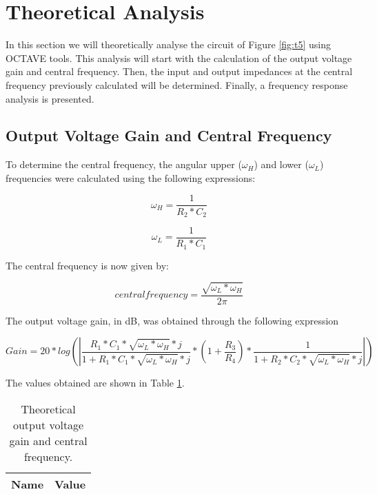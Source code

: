 \newpage
{}
\section{Theoretical Analysis}
\label{sec:analysis}

In this section we will theoretically analyse the circuit of Figure \ref{fig:t5} using OCTAVE tools. This analysis will start with the calculation of the output voltage gain and central frequency. Then, the input and output impedances at the central frequency previously calculated will be determined. Finally, a frequency response analysis is presented.


\subsection{Output Voltage Gain and Central Frequency}


To determine the central frequency, the angular upper ($\omega_H$) and lower ($\omega_L$) frequencies were calculated using the following expressions:

\begin {equation}
	\omega_H = \frac{1}{R_2 *C_2}  
	\label{eq:wh}
\end{equation}

\begin {equation}
	\omega_L= \frac{1}{R_1*C_1}   
	\label{eq:wl}
\end{equation}

The central frequency is now given by:

\begin {equation}
	central frequency = \frac{\sqrt{\omega_L * \omega_H }}{2\pi}
	\label{eq:CentralFreq}
\end{equation}

The output voltage gain, in dB, was obtained through the following expression

\begin {equation}
	Gain = 20*log(|\frac{R_1*C_1*\sqrt{\omega_L * \omega_H }*j}{1+R_1*C_1*\sqrt{\omega_L * \omega_H }*j}*(1+\frac{R_3}{R_4})*\frac{1}{1+R_2*C_2*\sqrt{\omega_L * \omega_H }*j}|)
	\label{eq:gain}
\end{equation} 

The values obtained are shown in Table \ref{tab:teoresults}.

\begin{table}[H]
	\centering
	\begin{tabular}{|l|r|}
		\hline    
		{\bf Name} & {\bf Value} \\ \hline
		
	\end{tabular}
	\caption{Theoretical output voltage gain and central frequency.}
	\label{tab:teoresults}
\end{table}

